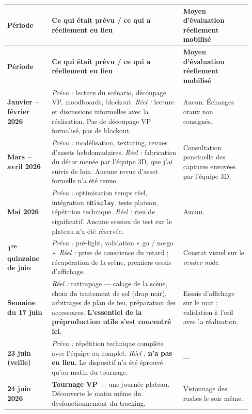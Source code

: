\documentclass[11pt,a4paper]{report}
\begin{document}
\begin{center}
\small
\begin{longtable}{>{\bfseries}p{2.5cm} >{\RaggedRight\arraybackslash}p{5.2cm} >{\RaggedRight\arraybackslash}p{5.1cm}}
\rowcolor{brjaune}\textbf{Période} & \textbf{Ce qui était prévu / ce qui a réellement eu lieu} & \textbf{Moyen d'évaluation réellement mobilisé} \\
\midrule
\endfirsthead
\rowcolor{brjaune}\textbf{Période} & \textbf{Ce qui était prévu / ce qui a réellement eu lieu} & \textbf{Moyen d'évaluation réellement mobilisé} \\
\midrule
\endhead
Janvier -- février 2026 & \textit{Prévu :} lecture du scénario, découpage VP, moodboards, blockout. \newline \textit{Réel :} lecture et discussions informelles avec la réalisation. Pas de découpage VP formalisé, pas de blockout. & Aucun. Échanges oraux non consignés. \\
Mars -- avril 2026 & \textit{Prévu :} modélisation, texturing, revues d'assets hebdomadaires. \newline \textit{Réel :} fabrication du décor menée par l'équipe 3D, que j'ai suivie de loin. Aucune revue d'asset formelle n'a été tenue. & Consultation ponctuelle des captures envoyées par l'équipe 3D. \\
Mai 2026 & \textit{Prévu :} optimisation temps réel, intégration \texttt{nDisplay}, tests plateau, répétition technique. \newline \textit{Réel :} rien de significatif. Aucune session de test sur le plateau n'a été réservée. & Aucun. \\
1\textsuperscript{re} quinzaine de juin & \textit{Prévu :} pré-light, validation « go / no-go ». \newline \textit{Réel :} prise de conscience du retard ; récupération de la scène, premiers essais d'affichage. & Constat visuel sur le \emph{render node}. \\
Semaine du 17 juin & \textit{Réel :} rattrapage --- calage de la scène, choix du traitement de sol (drap noir), arbitrages de plan de feu, préparation des accessoires. \textbf{L'essentiel de la préproduction utile s'est concentré ici.} & Essais d'affichage sur le mur ; validation à l'\oe il avec la réalisation. \\
23 juin (veille) & \textit{Prévu :} répétition technique complète avec l'équipe au complet. \newline \textit{Réel :} \textbf{n'a pas eu lieu.} Le dispositif n'a été éprouvé qu'au matin du tournage. & --- \\
\textbf{24 juin 2026} & \textbf{Tournage VP} --- une journée plateau. Découverte le matin même du dysfonctionnement du tracking. & Visionnage des rushes le soir même. \\
\end{longtable}
\end{center}
\end{document}

